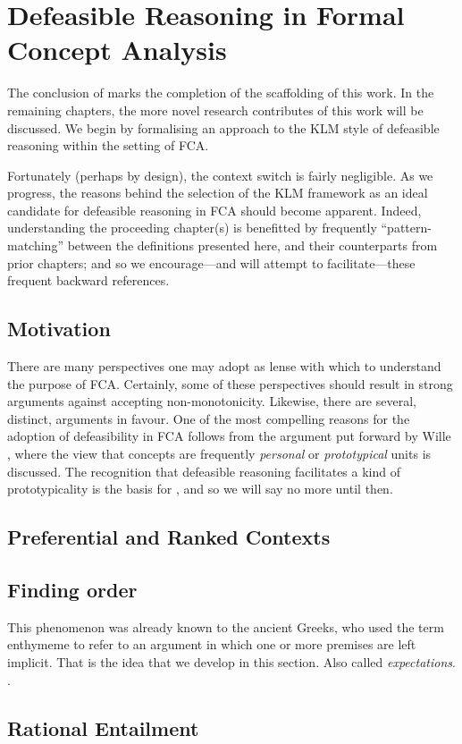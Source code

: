 \chapter{Defeasible Reasoning in Formal Concept Analysis}
\label{chapter:defeasible-reasoning-in-fca}

The conclusion of  marks the completion of the scaffolding of this work. In the
remaining chapters, the more novel research contributes of this work will be discussed. We begin by formalising an approach
to the KLM style of defeasible reasoning within the setting of FCA.

Fortunately (perhaps by design), the context switch is fairly negligible. As we progress, the reasons behind the
selection of the KLM framework as an ideal candidate for defeasible reasoning in FCA should become apparent. Indeed,
understanding the proceeding chapter(s) is benefitted by frequently ``pattern-matching'' between the definitions presented
here, and their counterparts from prior chapters; and so we encourage---and will attempt to facilitate---these frequent backward
references.

\section{Motivation}
\label{section:motivation}

There are many perspectives one may adopt as lense with which to understand the purpose of FCA. Certainly, some of these
perspectives should result in strong arguments against accepting non-monotonicity. Likewise, there are several, distinct,
arguments in favour. One of the most compelling reasons for the adoption of defeasibility in FCA follows from the argument
put forward by Wille \cite{Wille2005}, where the view that concepts are frequently \textit{personal} or \textit{prototypical}
units is discussed. The recognition that defeasible reasoning facilitates a kind of prototypicality is the basis for ,
and so we will say no more until then.

\clearpage

\section{Preferential and Ranked Contexts}
\clearpage

\section{Finding order}
\clearpage
This phenomenon was already known to the ancient Greeks, who used the term enthymeme to refer to an argument in which one
or more premises are left implicit. That is the idea that we develop in this section. Also called \textit{expectations}.
\cite{makinson2003bridges}.

\section{Rational Entailment}
\clearpage